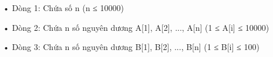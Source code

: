 • Dòng 1: Chứa số n (n ≤ 10000)


• Dòng 2: Chứa n số nguyên dương A[1], A[2], ..., A[n] (1 ≤ A[i] ≤ 10000)


• Dòng 3: Chứa n số nguyên dương B[1], B[2], ..., B[n] (1 ≤ B[i] ≤ 100)